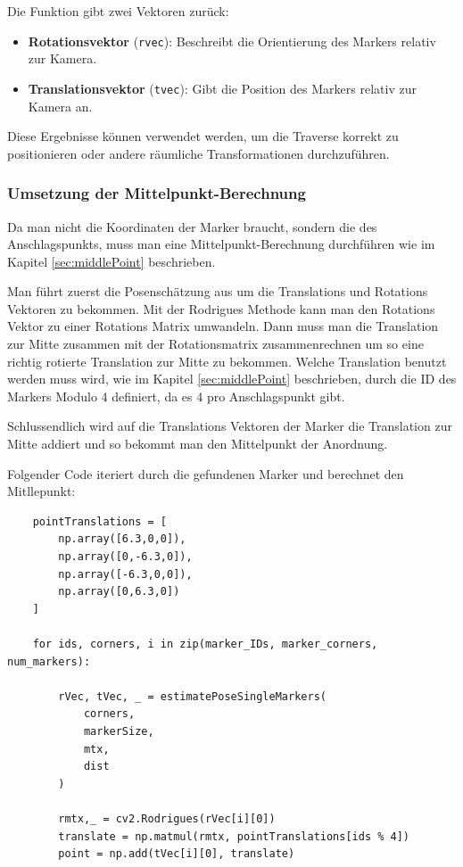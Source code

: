 Die Funktion gibt zwei Vektoren zurück:
\begin{itemize}
    \item \textbf{Rotationsvektor} (\texttt{rvec}): Beschreibt die Orientierung des Markers relativ zur Kamera.
    \item \textbf{Translationsvektor} (\texttt{tvec}): Gibt die Position des Markers relativ zur Kamera an.
\end{itemize}

Diese Ergebnisse können verwendet werden, um die Traverse korrekt zu positionieren oder andere 
räumliche Transformationen durchzuführen.


\subsubsection{Umsetzung der Mittelpunkt-Berechnung}

Da man nicht die Koordinaten der Marker braucht, sondern die des Anschlagspunkts, muss man eine 
Mittelpunkt-Berechnung durchführen wie im Kapitel \ref{sec:middlePoint} beschrieben.

Man führt zuerst die Posenschätzung aus um die Translations und Rotations Vektoren zu bekommen.
Mit der Rodrigues Methode kann man den Rotations Vektor zu einer Rotations Matrix umwandeln.
Dann muss man die Translation zur Mitte zusammen mit der Rotationsmatrix zusammenrechnen um so eine richtig rotierte Translation zur Mitte zu bekommen.
Welche Translation benutzt werden muss wird, wie im Kapitel \ref{sec:middlePoint} beschrieben, durch die ID des Markers Modulo 4 definiert, da es 4 pro Anschlagspunkt gibt.

Schlussendlich wird auf die Translations Vektoren der Marker die Translation zur Mitte addiert 
und so bekommt man den Mittelpunkt der Anordnung. \clearpage


Folgender Code iteriert durch die gefundenen Marker und berechnet den Mitllepunkt: 


\begin{lstlisting}
    pointTranslations = [
        np.array([6.3,0,0]),
        np.array([0,-6.3,0]),
        np.array([-6.3,0,0]),
        np.array([0,6.3,0])
    ]

    for ids, corners, i in zip(marker_IDs, marker_corners, num_markers):
        
        rVec, tVec, _ = estimatePoseSingleMarkers(
            corners,
            markerSize, 
            mtx, 
            dist
        )
    
        rmtx,_ = cv2.Rodrigues(rVec[i][0])
        translate = np.matmul(rmtx, pointTranslations[ids % 4])
        point = np.add(tVec[i][0], translate)
\end{lstlisting}





